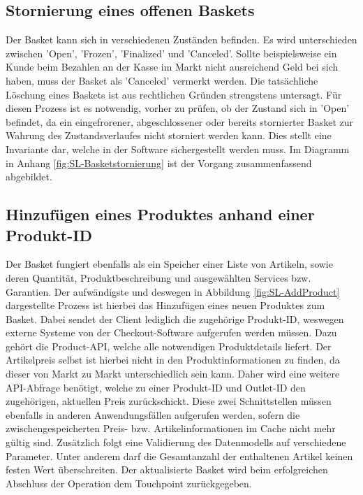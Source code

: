 \subsection{Stornierung eines offenen Baskets}

Der Basket kann sich in verschiedenen Zuständen befinden. Es wird unterschieden zwischen 'Open', 'Frozen', 'Finalized' und 'Canceled'. Sollte beispielsweise ein Kunde beim Bezahlen an der Kasse im Markt nicht ausreichend Geld bei sich haben, muss der Basket als 'Canceled' vermerkt werden. Die tatsächliche Löschung eines Baskets ist aus rechtlichen Gründen strengstens untersagt. Für diesen Prozess ist es notwendig, vorher zu prüfen, ob der Zustand sich in 'Open' befindet, da ein eingefrorener, abgeschlossener oder bereits stornierter Basket zur Wahrung des Zustandsverlaufes nicht storniert werden kann. Dies stellt eine Invariante dar, welche in der Software sichergestellt werden muss. Im Diagramm in Anhang \ref{fig:SL-Basketstornierung} ist der Vorgang zusammenfassend abgebildet.

\pagebreak


\subsection{Hinzufügen eines Produktes anhand einer Produkt-ID}

Der Basket fungiert ebenfalls als ein Speicher einer Liste von Artikeln, sowie deren Quantität, Produktbeschreibung und ausgewählten Services bzw. Garantien. Der aufwändigste und deswegen in Abbildung \ref{fig:SL-AddProduct} dargestellte Prozess ist hierbei das Hinzufügen eines neuen Produktes zum Basket. Dabei sendet der Client lediglich die zugehörige Produkt-ID, weswegen externe Systeme von der Checkout-Software aufgerufen werden müssen. Dazu gehört die Product-API, welche alle notwendigen Produktdetails liefert. Der Artikelpreis selbst ist hierbei nicht in den Produktinformationen zu finden, da dieser von Markt zu Markt unterschiedlich sein kann. Daher wird eine weitere API-Abfrage benötigt, welche zu einer Produkt-ID und Outlet-ID den zugehörigen, aktuellen Preis zurückschickt. Diese zwei Schnittstellen müssen ebenfalls in anderen Anwendungsfällen aufgerufen werden, sofern die zwischengespeicherten Preis- bzw. Artikelinformationen im Cache nicht mehr gültig sind. Zusätzlich folgt eine Validierung des Datenmodells auf verschiedene Parameter. Unter anderem darf die Gesamtanzahl der enthaltenen Artikel keinen festen Wert überschreiten. Der aktualisierte Basket wird beim erfolgreichen Abschluss der Operation dem Touchpoint zurückgegeben.

